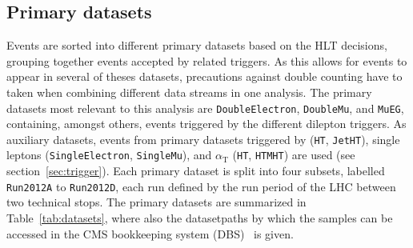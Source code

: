 \subsection{Primary datasets}

Events are sorted into different primary datasets based on the HLT decisions, grouping together events accepted by related triggers. As this allows for events to appear in several of theses datasets, precautions against double counting have to taken when combining different data streams in one analysis. The primary datasets most relevant to this analysis are \verb+DoubleElectron+, \verb+DoubleMu+, and \verb+MuEG+, containing, amongst others, events triggered by the different dilepton triggers. As auxiliary datasets, events from primary datasets triggered by \HT (\verb+HT+, \verb+JetHT+), single leptons (\verb+SingleElectron+, \verb+SingleMu+), and $\alpha_\mathrm{T}$ (\verb+HT+, \verb+HTMHT+) are used (see section~\ref{sec:trigger}). Each primary dataset is split into four subsets, labelled \verb+Run2012A+ to \verb+Run2012D+, each run defined by the run period of the LHC between two technical stops. The primary datasets are summarized in Table~\ref{tab:datasets}, where also the datasetpaths by which the samples can be accessed in the CMS bookkeeping system (DBS)~\cite{1742-6596-119-7-072001} is given.   

